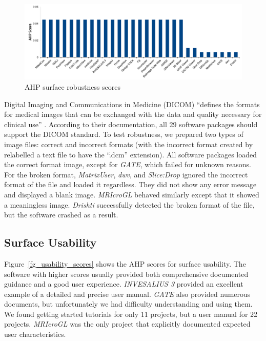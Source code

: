 \documentclass[11pt]{article}
\begin{document}
\begin{figure}[!ht]
\includegraphics[scale=0.47]{robustness_scores.pdf}
\caption{AHP surface robustness scores}
\label{fg_robustness_scores}
\end{figure}

Digital Imaging and Communications in Medicine (DICOM) ``defines the formats for
medical images that can be exchanged with the data and quality necessary for
clinical use'' \cite{MITA2021}. According to their documentation, all 29
software packages should support the DICOM standard. To test robustness, we
prepared two types of image files: correct and incorrect formats (with the
incorrect format created by relabelled a text file to have the ``.dcm''
extension).  All software packages loaded the correct format image, except for
\textit{GATE}, which failed for unknown reasons.  For the broken format,
\textit{MatrixUser}, \textit{dwv}, and \textit{Slice:Drop} ignored the incorrect
format of the file and loaded it regardless. They did not show any error message
and displayed a blank image. \textit{MRIcroGL} behaved similarly except that it
showed a meaningless image. \textit{Drishti} successfully detected the broken
format of the file, but the software crashed as a result.

\subsection{Surface Usability} \label{sec_result_usability}

Figure~\ref{fg_usability_scores} shows the AHP scores for surface usability. The
software with higher scores usually provided both comprehensive documented
guidance and a good user experience. \textit{INVESALIUS 3} provided an excellent
example of a detailed and precise user manual. \textit{GATE} also provided
numerous documents, but unfortunately we had difficulty understanding and using
them. We found getting started tutorials for only 11 projects, but a user manual
for 22 projects. \textit{MRIcroGL} was the only project that explicitly
documented expected user characteristics.
\end{document}
